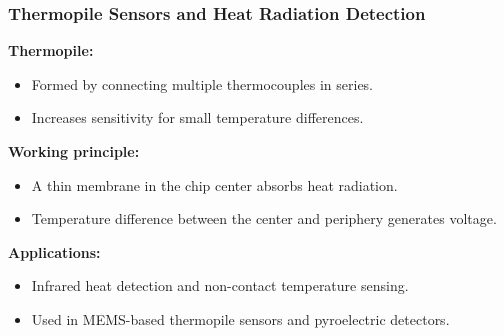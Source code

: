 \begin{frame}
	\frametitle{Thermopile Sensors and Heat Radiation Detection}
    \small
    \textbf{Thermopile:}
    \begin{itemize}
        \item Formed by connecting multiple thermocouples in series.
        \item Increases sensitivity for small temperature differences.
    \end{itemize}
    \textbf{Working principle:}
    \begin{itemize}
        \item A thin membrane in the chip center absorbs heat radiation.
        \item Temperature difference between the center and periphery generates voltage.
    \end{itemize}
    \textbf{Applications:}
    \begin{itemize}
        \item Infrared heat detection and non-contact temperature sensing.
        \item Used in MEMS-based thermopile sensors and pyroelectric detectors.
    \end{itemize}
\end{frame}



